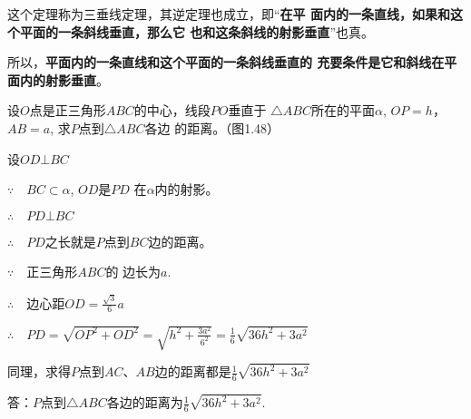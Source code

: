 这个定理称为三垂线定理，其逆定理也成立，即“\textbf{在平
面内的一条直线，如果和这个平面的一条斜线垂直，那么它
也和这条斜线的射影垂直}”也真。

所以，\textbf{平面内的一条直线和这个平面的一条斜线垂直的
充要条件是它和斜线在平面内的射影垂直}。


\begin{example}
  设$O$点是正三角形$ABC$的中心，线段$PO$垂直于
$\triangle ABC$所在的平面$\alpha$, $OP=h$，$AB=a$, 求$P$点到$\triangle ABC$各边
的距离。（图1.48）
\end{example}

\begin{figure}[htp]
  \centering
{}  
  \caption{}
\end{figure}

\begin{solution}
设$OD\bot BC$

$\because\quad BC\subset \alpha$, $OD$是$PD$
在$\alpha$内的射影。

$\therefore\quad PD\bot BC$

$\therefore\quad PD$之长就是$P$点到$BC$边的距离。

$\because\quad $正三角形$ABC$的
边长为$a$.

$\therefore\quad $边心距$OD=\frac{\sqrt{3}}{6}a$

$\therefore\quad PD=\sqrt{OP^2+OD^2}=\sqrt{h^2+\frac{3a^2}{6^2}}=\frac{1}{6}\sqrt{36h^2+3a^2}$

同理，求得$P$点到$AC$、$AB$边的距离都是$\frac{1}{6}\sqrt{36h^2+3a^2}$

答：$P$点到$\triangle ABC$各边的距离为$\frac{1}{6}\sqrt{36h^2+3a^2}$.
\end{solution}



